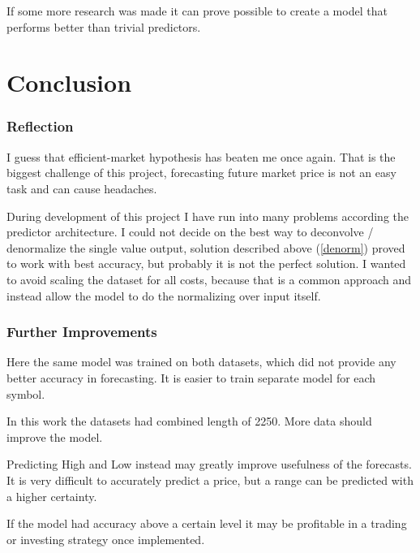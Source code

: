\documentclass[a4paper,12pt]{article}
\begin{document}
If some more research was made it can prove possible to create a model that performs better than trivial predictors.


\part{Conclusion}
\section{Reflection}
I guess that efficient-market hypothesis has beaten me once again. That is the biggest challenge of this project, forecasting future market price is not an easy task and can cause headaches.

During development of this project I have run into many problems according the predictor architecture. I could not decide on the best way to deconvolve / denormalize the single value output, solution described above (\ref{denorm}) proved to work with best accuracy, but probably it is not the perfect solution. I wanted to avoid scaling the dataset for all costs, because that is a common approach and instead allow the model to do the normalizing over input itself.

\section{Further Improvements}
Here the same model was trained on both datasets, which did not provide any better accuracy in forecasting.
It is easier to train separate model for each symbol.

In this work the datasets had combined length of 2250. More data should improve the model.

Predicting High and Low instead may greatly improve usefulness of the forecasts. It is very difficult to accurately predict a price, but a range can be predicted with a higher certainty.

If the model had accuracy above a certain level it may be profitable in a trading or investing strategy once implemented.

\end{document}
